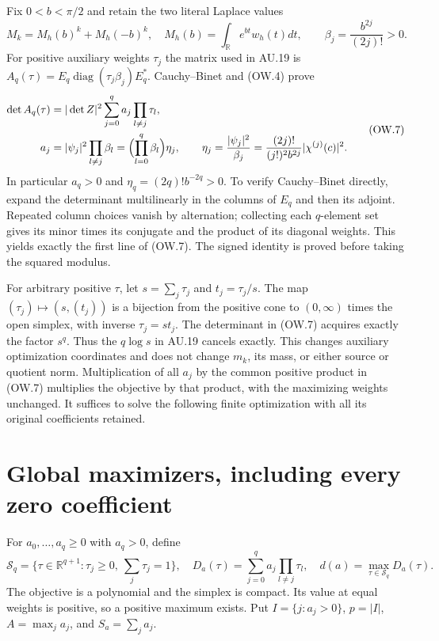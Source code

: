 \documentclass[11pt]{article}
\newcommand{\R}{\mathbb R}
\newcommand{\diag}{\operatorname{diag}}
\begin{document}
Fix $0<b<\pi/2$ and retain the two literal Laplace values
\[
 M_k=M_h(b)^k+M_h(-b)^k,\quad M_h(b)=\int_\R e^{bt}w_h(t)dt,
 \qquad \beta_j=\frac{b^{2j}}{(2j)!}>0.                   \tag{OW.6}
\]
For positive auxiliary weights $\tau_j$ the matrix used in AU.19 is
$A_q(\tau)=E_q\diag(\tau_j\beta_j)E_q^*$.
Cauchy--Binet and (OW.4) prove
\[
 \begin{split}
 \det A_q(\tau)
 &=|\det Z|^2\sum_{j=0}^q a_j\prod_{l\ne j}\tau_l,\\
 a_j&=|\psi_j|^2\prod_{l\ne j}\beta_l
       =\Bigl(\prod_{l=0}^q\beta_l\Bigr)\eta_j,\qquad
 \eta_j=\frac{|\psi_j|^2}{\beta_j}
       =\frac{(2j)!}{(j!)^2b^{2j}}|\chi^{(j)}(c)|^2.
 \end{split}                                               \tag{OW.7}
\]
In particular $a_q>0$ and $\eta_q=(2q)!b^{-2q}>0$.
To verify Cauchy--Binet directly, expand the determinant multilinearly
in the columns of $E_q$ and then its adjoint. Repeated column choices
vanish by alternation; collecting each $q$-element set gives its
minor times its conjugate and the product of its diagonal weights.
This yields exactly the first line of (OW.7). The signed identity is
proved before taking the squared modulus.

For arbitrary positive $\tau$, let $s=\sum_j\tau_j$ and
$t_j=\tau_j/s$. The map $(\tau_j)\mapsto(s,(t_j))$ is a bijection
from the positive cone to $(0,\infty)$ times the open simplex, with
inverse $\tau_j=st_j$. The determinant in (OW.7) acquires exactly
the factor $s^q$. Thus the $q\log s$ in AU.19 cancels exactly.
This changes auxiliary optimization coordinates and does not change
$m_k$, its mass, or either source or quotient norm. Multiplication
of all $a_j$ by the common positive product in (OW.7) multiplies the
objective by that product, with the maximizing weights unchanged.
It suffices to solve the following finite optimization with all its
original coefficients retained.

\section{Global maximizers, including every zero coefficient}

For $a_0,\ldots,a_q\ge0$ with $a_q>0$, define
\[
 \mathcal S_q=\{\tau\in\R^{q+1}:\tau_j\ge0,\ \sum_j\tau_j=1\},
 \quad D_a(\tau)=\sum_{j=0}^qa_j\prod_{l\ne j}\tau_l,
 \quad d(a)=\max_{\tau\in\mathcal S_q}D_a(\tau).          \tag{OW.8}
\]
The objective is a polynomial and the simplex is compact. Its value
at equal weights is positive, so a positive maximum exists. Put
$I=\{j:a_j>0\}$, $p=|I|$, $A=\max_j a_j$, and $S_a=\sum_j a_j$.
\end{document}
